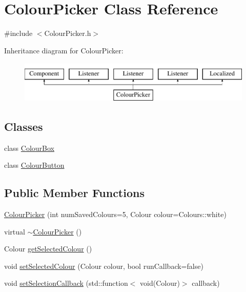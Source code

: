 \hypertarget{classColourPicker}{}\section{Colour\+Picker Class Reference}
\label{classColourPicker}


{\ttfamily \#include $<$Colour\+Picker.\+h$>$}

Inheritance diagram for Colour\+Picker\+:\begin{figure}[H]
\begin{center}
\leavevmode
\includegraphics[height=2.000000cm]{classColourPicker}
\end{center}
\end{figure}
\subsection*{Classes}
\begin{DoxyCompactItemize}
\item 
class \mbox{\hyperlink{classColourPicker_1_1ColourBox}{Colour\+Box}}
\item 
class \mbox{\hyperlink{classColourPicker_1_1ColourButton}{Colour\+Button}}
\end{DoxyCompactItemize}
\subsection*{Public Member Functions}
\begin{DoxyCompactItemize}
\item 
\mbox{\hyperlink{classColourPicker_ab9845d6261629eab48409af6f6cadc78}{Colour\+Picker}} (int num\+Saved\+Colours=5, Colour colour=Colours\+::white)
\item 
virtual \mbox{\hyperlink{classColourPicker_af32a8228429703caf9773fd487dfb130}{$\sim$\+Colour\+Picker}} ()
\item 
Colour \mbox{\hyperlink{classColourPicker_a7a30eb54f6ba258e4108621787466e3e}{get\+Selected\+Colour}} ()
\item 
void \mbox{\hyperlink{classColourPicker_a1cbc99e3fe17c0b8679d33bcc7fcf4cf}{set\+Selected\+Colour}} (Colour colour, bool run\+Callback=false)
\item 
void \mbox{\hyperlink{classColourPicker_a8746628b7337bfe94aa0c1e426a48884}{set\+Selection\+Callback}} (std\+::function$<$ void(Colour)$>$ callback)
\end{DoxyCompactItemize}
